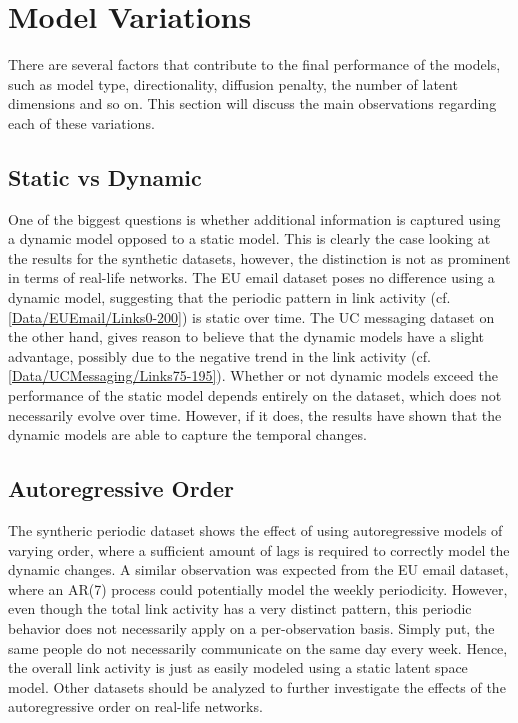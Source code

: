 \section{Model Variations}

There are several factors that contribute to the final performance of the models, such as model type, directionality, diffusion penalty, the number of latent dimensions and so on. This section will discuss the main observations regarding each of these variations.

\subsection{Static vs Dynamic}

    One of the biggest questions is whether additional information is captured using a dynamic model opposed to a static model. This is clearly the case looking at the results for the synthetic datasets, however, the distinction is not as prominent in terms of real-life networks.
    The EU email dataset poses no difference using a dynamic model, suggesting that the periodic pattern in link activity (cf. \cref{Data/EUEmail/Links0-200}) is static over time. The UC messaging dataset on the other hand, gives reason to believe that the dynamic models have a slight advantage, possibly due to the negative trend in the link activity (cf. \cref{Data/UCMessaging/Links75-195}).
    Whether or not dynamic models exceed the performance of the static model depends entirely on the dataset, which does not necessarily evolve over time. However, if it does, the results have shown that the dynamic models are able to capture the temporal changes.

\subsection{Autoregressive Order}

    The syntheric periodic dataset shows the effect of using autoregressive models of varying order, where a sufficient amount of lags is required to correctly model the dynamic changes. A similar observation was expected from the EU email dataset, where an AR(7) process could potentially model the weekly periodicity. However, even though the total link activity has a very distinct pattern, this periodic behavior does not necessarily apply on a per-observation basis. Simply put, the same people do not necessarily communicate on the same day every week. Hence, the overall link activity is just as easily modeled using a static latent space model. Other datasets should be analyzed to further investigate the effects of the autoregressive order on real-life networks.

